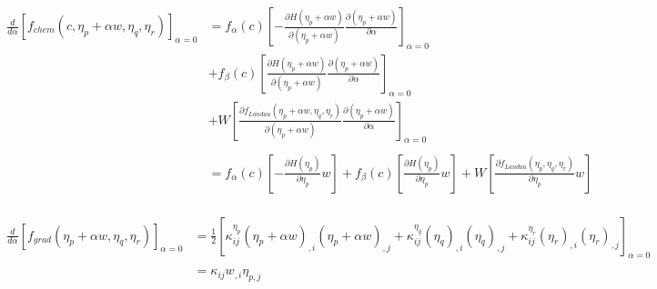 \documentclass[11pt]{article}
\renewcommand{\=}[1]{\stackrel{#1}{=}} %
\theoremstyle{definition}
\theoremstyle{remark}
\begin{document}
\begin{align}
\begin{split}
\frac{d}{d\alpha} \left[ f_{chem}(c,\eta_p+\alpha w,\eta_q,\eta_r)\right]_{\alpha=0} &= f_{\alpha}(c) \left[  -\frac{\partial H(\eta_p+\alpha w)}{\partial (\eta_p + \alpha w)} \frac{\partial(\eta_p + \alpha w)}{\partial \alpha} \right]_{\alpha=0} \\
&+f_{\beta}(c)  \left[  \frac{\partial H(\eta_p+\alpha w)}{\partial (\eta_p + \alpha w)} \frac{\partial(\eta_p + \alpha w)}{\partial \alpha} \right]_{\alpha=0} \\
&+ W \left[\frac{\partial f_{Landau}(\eta_p+\alpha w,\eta_q,\eta_r)}{\partial (\eta_p + \alpha w)} \frac{\partial(\eta_p + \alpha w)}{\partial \alpha} \right]_{\alpha=0}\\
\\
&=f_{\alpha}(c) \left[  -\frac{\partial H(\eta_p)}{\partial \eta_p} w \right] 
+f_{\beta}(c) \left[  \frac{\partial H(\eta_p)}{\partial \eta_p } w \right] 
+ W \left[\frac{\partial f_{Landau}(\eta_p,\eta_q,\eta_r)}{\partial \eta_p} w \right] 
\end{split}
\end{align}

\begin{align}
\begin{split}
\frac{d}{d\alpha} \left[ f_{grad}(\eta_p+\alpha w,\eta_q,\eta_r)\right]_{\alpha=0} &= \frac{1}{2} \left[ \kappa_{ij}^{\eta_p} (\eta_p+\alpha w)_{,i}(\eta_p+\alpha w)_{,j} +\kappa_{ij}^{\eta_q} (\eta_q)_{,i}(\eta_q)_{,j} + \kappa_{ij}^{\eta_r} (\eta_r)_{,i}(\eta_r)_{,j}  \right]_{\alpha=0} \\
\\
&= \kappa_{ij} w_{,i} \eta_{p,j}
\end{split}
\end{align}
\end{document}

